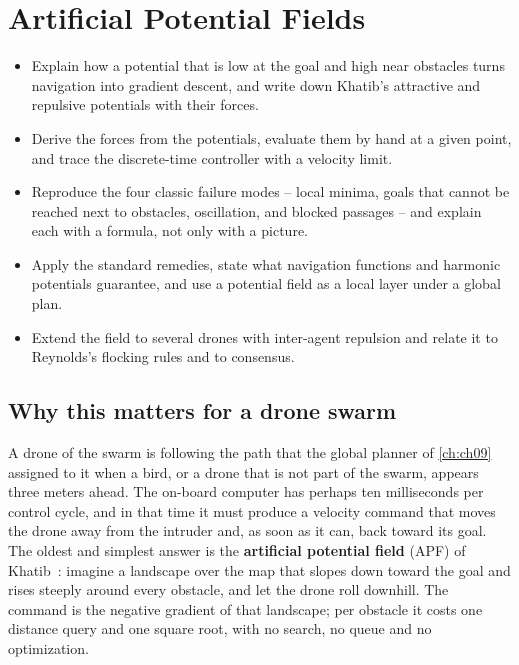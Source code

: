 \chapter{Artificial Potential Fields}
\label{ch:ch15}

\begin{objectives}
\begin{itemize}
  \item Explain how a potential that is low at the goal and high near obstacles turns navigation into gradient descent, and write down Khatib's attractive and repulsive potentials with their forces.
  \item Derive the forces from the potentials, evaluate them by hand at a given point, and trace the discrete-time controller with a velocity limit.
  \item Reproduce the four classic failure modes -- local minima, goals that cannot be reached next to obstacles, oscillation, and blocked passages -- and explain each with a formula, not only with a picture.
  \item Apply the standard remedies, state what navigation functions and harmonic potentials guarantee, and use a potential field as a local layer under a global plan.
  \item Extend the field to several drones with inter-agent repulsion and relate it to Reynolds's flocking rules and to consensus.
\end{itemize}
\end{objectives}

\section{Why this matters for a drone swarm}
\label{sec:ch15-motivation}

A drone of the swarm is following the path that the global planner of
\cref{ch:ch09} assigned to it when a bird, or a drone that is not part of the
swarm, appears three meters ahead. The on-board computer has perhaps ten
milliseconds per control cycle, and in that time it must produce a velocity
command that moves the drone away from the intruder and, as soon as it can,
back toward its goal. The oldest and simplest answer is the
\textbf{artificial potential field} (APF) of
Khatib~\cite{khatib1986realtime}: imagine a landscape over the map that slopes
down toward the goal and rises steeply around every obstacle, and let the
drone roll downhill. The command is the negative gradient of that landscape;
per obstacle it costs one distance query and one square root, with no
search, no queue and no optimization.

